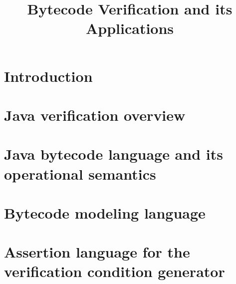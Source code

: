 \documentclass[book,10pt]{book}
\title{Bytecode Verification and its Applications}
\begin{document}
    \lstset{language=Jml}
    \lstset{frameround=tttt}

    \renewcommand{\topfraction}{0.9}
    \renewcommand{\textfraction}{0.05}
    \renewcommand{\floatpagefraction}{0.75}

\maketitle
\tableofcontents

\chapter{Introduction}
    
 
\chapter{Java verification overview}\label{javaVerif}
   
   
   
%   
   
   	  
   
   
\chapter{Java bytecode language and its operational semantics} \label{opSem:prelim}
     
   
   
   
   
   
   
   
   
   
   
  
   
  
   

\chapter{Bytecode modeling language} \label{bcsl}
  \lstset{numbers=left,numberstyle=\small,stepnumber=1,numbersep=5pt}
   
  
  
  
  
  

\chapter{Assertion language for the verification condition generator}\label{assertLang}
  
  
  
  
   
\end{document}

